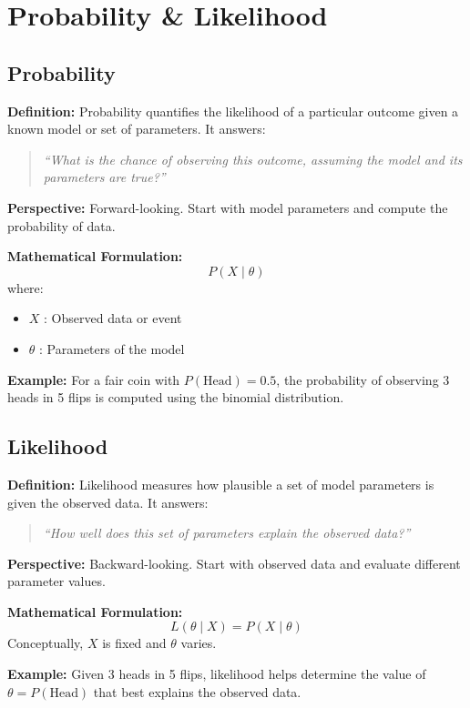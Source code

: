 \documentclass[10pt,a4paper]{article}
\begin{document}
\section{Probability \& Likelihood}

\subsection{Probability}
\textbf{Definition:} Probability quantifies the likelihood of a particular outcome given a known model or set of parameters. It answers:
\begin{quote}
\emph{``What is the chance of observing this outcome, assuming the model and its parameters are true?''}
\end{quote}

\textbf{Perspective:} Forward-looking. Start with model parameters and compute the probability of data.

\textbf{Mathematical Formulation:}
\[
P(X \mid \theta)
\]
where:
\begin{itemize}
\item $X$ : Observed data or event
\item $\theta$ : Parameters of the model
\end{itemize}

\textbf{Example:}  
For a fair coin with $P(\text{Head}) = 0.5$, the probability of observing 3 heads in 5 flips is computed using the binomial distribution.


\subsection{Likelihood}
\textbf{Definition:} Likelihood measures how plausible a set of model parameters is given the observed data. It answers:
\begin{quote}
\emph{``How well does this set of parameters explain the observed data?''}
\end{quote}

\textbf{Perspective:} Backward-looking. Start with observed data and evaluate different parameter values.

\textbf{Mathematical Formulation:}
\[
L(\theta \mid X) = P(X \mid \theta)
\]
Conceptually, $X$ is fixed and $\theta$ varies.

\textbf{Example:}  
Given 3 heads in 5 flips, likelihood helps determine the value of $\theta = P(\text{Head})$ that best explains the observed data.
\end{document}
